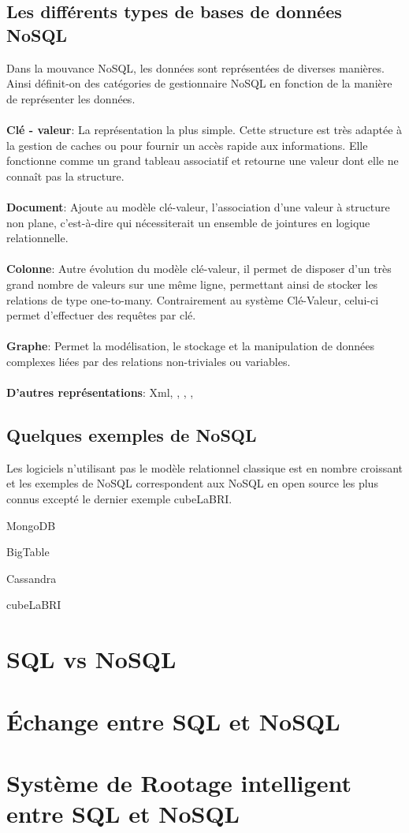 \subsection{Les différents types de bases de données \textsf{NoSQL}} 
 
Dans la mouvance \textsf{NoSQL}, les données sont représentées de
diverses manières. Ainsi définit-on des catégories de gestionnaire
\textsf{NoSQL} en fonction de la manière de représenter les données.
\\\\ 
\textbf{Clé - valeur}: La représentation la plus simple. Cette
structure est très adaptée à la gestion de caches ou pour fournir un
accès rapide aux informations. Elle fonctionne comme un grand tableau
associatif et retourne une valeur dont elle ne connaît pas la
structure.  
\\\\ 
{\bf Document}: Ajoute au modèle clé-valeur,
l’association d’une valeur à structure non plane, c’est-à-dire qui
nécessiterait un ensemble de jointures en logique relationnelle.
\\\\ 
{\bf Colonne}: Autre évolution du modèle clé-valeur, il permet de
disposer d'un très grand nombre de valeurs sur une même ligne,
permettant ainsi de stocker les relations de type one-to-many. 
Contrairement au système Clé-Valeur, celui-ci permet
d’effectuer des requêtes par clé.
\\\\
{\bf Graphe}: Permet la modélisation, le stockage et la manipulation de données
complexes liées par des relations non-triviales ou variables.
\\
\\
\textbf{D'autres représentations}: \textsf{Xml}, \textsf{}, \textsf{}, \textsf{}, 

\subsection{Quelques exemples de \textsf{NoSQL}}

Les logiciels n'utilisant pas le modèle relationnel classique est en
nombre croissant et les exemples de \textsf{NoSQL} correspondent aux
\textsf{NoSQL} en open source les plus connus excepté le dernier
exemple \textsf{cubeLaBRI}.

{\sf MongoDB}    

\textsf{BigTable}    

\textsf{Cassandra}

\textsf{cubeLaBRI}    

\section{\textsf{SQL} vs \textsf{NoSQL}}

\section{Échange entre \textsf{SQL} et \textsf{NoSQL}}

\section{Système de Rootage intelligent entre {\sf SQL} et {\sf NoSQL}}
